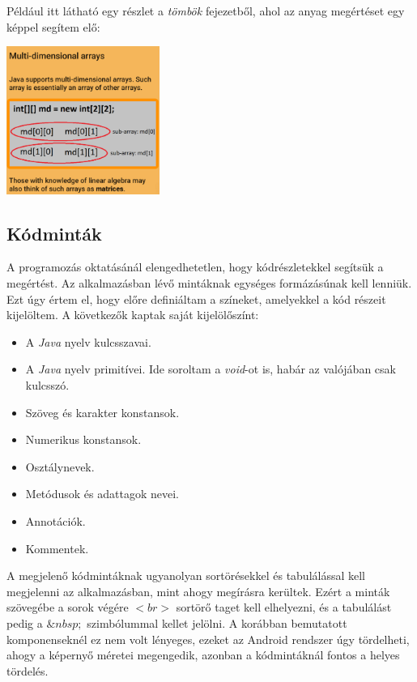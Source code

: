 \documentclass[12pt,a4paper]{article}
\begin{document}
	Például itt látható egy részlet a \textit{tömbök} fejezetből, ahol az anyag megértéset egy képpel segítem elő:
	
	\begin{center}
		\includegraphics[width=5cm]{image_component}
	\end{center}
	
	\subsection{Kódminták} \label{kodmintak}
	
	A programozás oktatásánál elengedhetetlen, hogy kódrészletekkel segítsük a megértést. Az alkalmazásban lévő mintáknak egységes formázásúnak kell lenniük. Ezt úgy értem el, hogy előre definiáltam a színeket, amelyekkel a kód részeit kijelöltem. A következők kaptak saját kijelölőszínt:
	
	\begin{itemize}
		\item A \textit{Java} nyelv kulcsszavai.
		\item A \textit{Java} nyelv primitívei. Ide soroltam a \textit{void}-ot is, habár az valójában csak kulcsszó.
		\item Szöveg és karakter konstansok.
		\item Numerikus konstansok.
		\item Osztálynevek.
		\item Metódusok és adattagok nevei.
		\item Annotációk.
		\item Kommentek. 
	\end{itemize}
	
	A megjelenő kódmintáknak ugyanolyan sortörésekkel és tabulálással kell megjelenni az alkalmazásban, mint ahogy megírásra kerültek. Ezért a minták szövegébe a sorok végére $<br>$ sortörő taget kell elhelyezni, és a tabulálást pedig a $\&nbsp;$ szimbólummal kellet jelölni. A korábban bemutatott komponenseknél ez nem volt lényeges, ezeket az Android rendszer úgy tördelheti, ahogy a képernyő méretei megengedik, azonban a kódmintáknál fontos a helyes tördelés.
	
\end{document}
